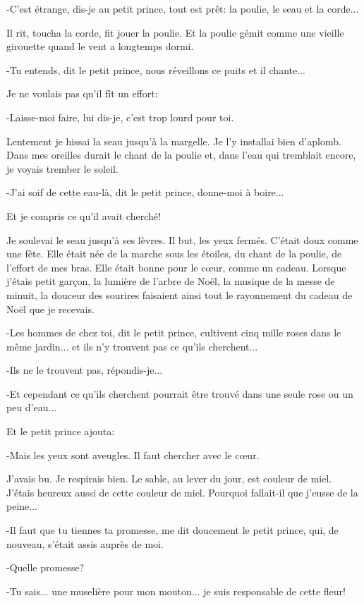 \documentclass{report}
\begin{document}

-C'est étrange, dis-je au petit prince, tout est prêt: la poulie, le seau et la corde...

Il rit, toucha la corde, fit jouer la poulie. Et la poulie gémit comme une vieille girouette quand le vent a longtemps dormi.

-Tu entends, dit le petit prince, nous réveillons ce puits et il chante...

Je ne voulais pas qu'il fît un effort:

-Laisse-moi faire, lui dis-je, c'est trop lourd pour toi.

Lentement je hissai la seau jusqu'à la margelle. Je l'y installai bien d'aplomb. Dans mes oreilles durait le chant de la poulie et, dans l'eau qui tremblait encore, je voyais trember le soleil.

-J'ai soif de cette eau-là, dit le petit prince, donne-moi à boire...

Et je compris ce qu'il avait cherché!

Je soulevai le seau jusqu'à ses lèvres. Il but, les yeux fermés. C'était doux comme une fête. Elle était née de la marche sous les étoiles, du chant de la poulie, de l'effort de mes bras. Elle était bonne pour le cœur, comme un cadeau. Lorsque j'étais petit garçon, la lumière de l'arbre de Noël, la musique de la messe de minuit, la douceur des sourires faisaient ainsi tout le rayonnement du cadeau de Noël que je recevais.

-Les hommes de chez toi, dit le petit prince, cultivent cinq mille roses dans le même jardin... et ils n'y trouvent pas ce qu'ils cherchent...

-Ils ne le trouvent pas, répondis-je...

-Et cependant ce qu'ils cherchent pourrait être trouvé dans une seule rose ou un peu d'eau...

Et le petit prince ajouta:

-Mais les yeux sont aveugles. Il faut chercher avec le cœur.

J'avais bu. Je respirais bien. Le sable, au lever du jour, est couleur de miel. J'étais heureux aussi de cette couleur de miel. Pourquoi fallait-il que j'eusse de la peine...

-Il faut que tu tiennes ta promesse, me dit doucement le petit prince, qui, de nouveau, s'était assis auprès de moi.

-Quelle promesse?

-Tu sais... une muselière pour mon mouton... je suis responsable de cette fleur!
\end{document}
